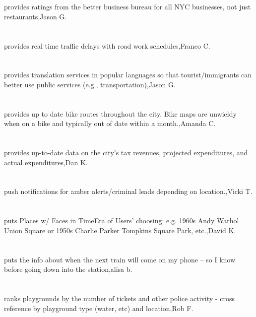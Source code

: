 \section{}provides ratings from the better business bureau for all NYC businesses, not just restaurants,Jason G.	
\section{}provides real time traffic delays with road work schedules,Franco C.	
\section{}provides translation services in popular languages so that tourist/immigrants can better use public services (e.g., transportation),Jason G.	
\section{}provides up to date bike routes throughout the city.  Bike maps are unwieldy when on a bike and typically out of date within a month.,Amanda C.	
\section{}provides up-to-date data on the city's tax revenues, projected expenditures, and actual expenditures,Dan K.	
\section{}push notifications for amber alerts/criminal leads depending on location.,Vicki T.	
\section{}puts Places w/ Faces in TimeEra of Users' choosing: e.g. 1960s Andy Warhol Union Square or 1950s Charlie Parker Tompkins Square Park, etc.,David K.	
\section{}puts the info about when the next train will come on my phone -- so I know before going down into the station,alisa b.	
\section{}ranks playgrounds by the number of tickets and other police activity - cross reference by playground type (water, etc) and location,Rob F.	
